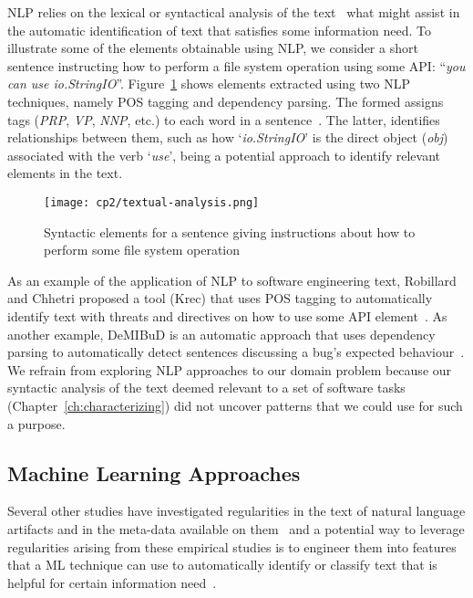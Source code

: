 \acf{NLP} relies on the lexical or syntactical analysis of the text~\cite{jurafsky2014speech}
what might assist in the automatic identification of text that satisfies some information need. 
To illustrate some of the elements obtainable using \acs{NLP}, we consider a short sentence 
instructing how to perform a file system operation using some API: ``\textit{you can use io.StringIO}''.
Figure~\ref{fig:nlp-analysis} shows elements extracted using two \acs{NLP} techniques,
namely \acf{POS} tagging and dependency parsing.
The formed assigns tags  ({\small \textit{PRP}, \textit{VP}, \textit{NNP},} etc.) to each word 
in a sentence~\cite{taylor2003penn}. The latter, identifies
relationships between them, such as how 
`\textit{io.StringIO}' is the direct object (\textit{obj})
associated with the verb `\textit{use}', 
being a potential approach to identify relevant elements in the text.



\medskip
\begin{figure}[h!]
    \centering
    \texttt{[image: cp2/textual-analysis.png]}
    \caption{Syntactic elements for a sentence giving instructions about how to perform some file system operation}
    \label{fig:nlp-analysis}
\end{figure}


As an example of the application of \ac{NLP} to software engineering text,
Robillard  and Chhetri proposed a tool (Krec)
that uses \acs{POS} tagging to automatically 
identify text with threats and directives on how to use some API element~\cite{Robillard2015}.
As another example, {\small DeMIBuD}
is an automatic approach that uses dependency parsing
to automatically detect sentences discussing a bug's expected behaviour~\cite{Chaparro2017}.
We refrain from exploring \acs{NLP} approaches to our domain problem because 
our syntactic analysis of the text deemed relevant to a set of software tasks (Chapter~\ref{ch:characterizing})
did not uncover patterns that we could use for such a purpose.







\subsection{Machine Learning Approaches}



Several other studies have investigated regularities in the text 
of natural language artifacts and 
in the meta-data available on them~\cite{Ko2006, Maalej2013, Arya2019}
and a potential way to leverage regularities arising from these empirical studies
is to engineer them into 
features that a  \acf{ML} technique can use to automatically identify or classify
text that is helpful for certain information need~\cite{Bavota2016}. 



